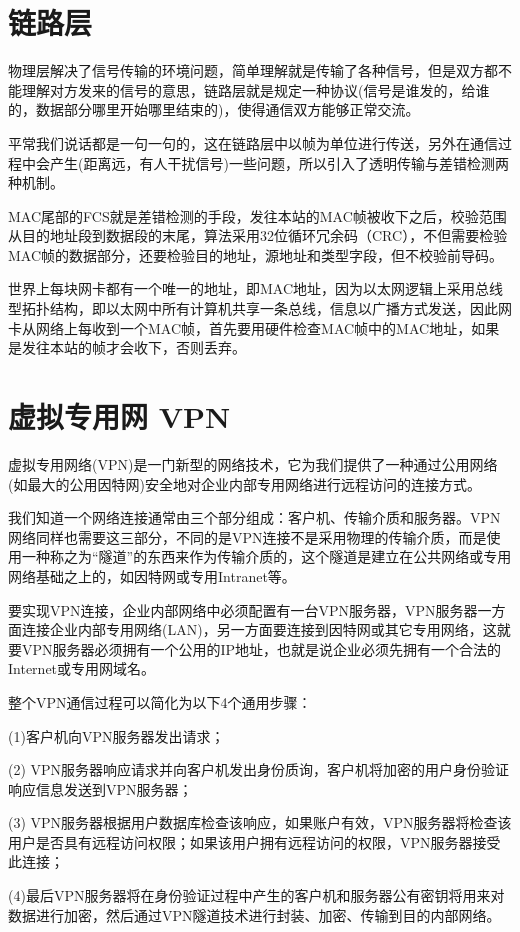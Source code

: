 \section{链路层}

物理层解决了信号传输的环境问题，简单理解就是传输了各种信号，但是双方都不能理解对方发来的信号的意思，链路层就是规定一种协议(信号是谁发的，给谁的，数据部分哪里开始哪里结束的)，使得通信双方能够正常交流。

平常我们说话都是一句一句的，这在链路层中以帧为单位进行传送，另外在通信过程中会产生(距离远，有人干扰信号)一些问题，所以引入了透明传输与差错检测两种机制。

MAC尾部的FCS就是差错检测的手段，发往本站的MAC帧被收下之后，校验范围从目的地址段到数据段的末尾，算法采用32位循环冗余码（CRC），不但需要检验MAC帧的数据部分，还要检验目的地址，源地址和类型字段，但不校验前导码。

世界上每块网卡都有一个唯一的地址，即MAC地址，因为以太网逻辑上采用总线型拓扑结构，即以太网中所有计算机共享一条总线，信息以广播方式发送，因此网卡从网络上每收到一个MAC帧，首先要用硬件检查MAC帧中的MAC地址，如果是发往本站的帧才会收下，否则丢弃。


\section{虚拟专用网 VPN}

虚拟专用网络(VPN)是一门新型的网络技术，它为我们提供了一种通过公用网络(如最大的公用因特网)安全地对企业内部专用网络进行远程访问的连接方式。

我们知道一个网络连接通常由三个部分组成：客户机、传输介质和服务器。VPN网络同样也需要这三部分，不同的是VPN连接不是采用物理的传输介质，而是使用一种称之为“隧道”的东西来作为传输介质的，这个隧道是建立在公共网络或专用网络基础之上的，如因特网或专用Intranet等。

要实现VPN连接，企业内部网络中必须配置有一台VPN服务器，VPN服务器一方面连接企业内部专用网络(LAN)，另一方面要连接到因特网或其它专用网络，这就要VPN服务器必须拥有一个公用的IP地址，也就是说企业必须先拥有一个合法的Internet或专用网域名。

整个VPN通信过程可以简化为以下4个通用步骤：

(1)客户机向VPN服务器发出请求；

(2) VPN服务器响应请求并向客户机发出身份质询，客户机将加密的用户身份验证响应信息发送到VPN服务器；

(3) VPN服务器根据用户数据库检查该响应，如果账户有效，VPN服务器将检查该用户是否具有远程访问权限；如果该用户拥有远程访问的权限，VPN服务器接受此连接；

(4)最后VPN服务器将在身份验证过程中产生的客户机和服务器公有密钥将用来对数据进行加密，然后通过VPN隧道技术进行封装、加密、传输到目的内部网络。